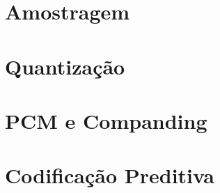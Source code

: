
\section{Amostragem}


\section{Quantização}


\section{PCM e Companding}


\section{Codificação Preditiva}

